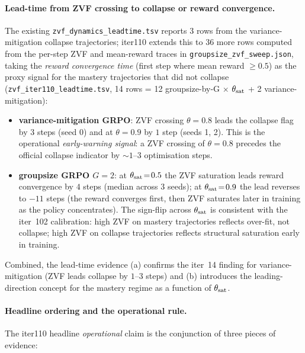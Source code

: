 \paragraph{Lead-time from ZVF crossing to collapse or reward
convergence.}
The existing \texttt{zvf\_dynamics\_leadtime.tsv} reports 3 rows from
the variance-mitigation collapse trajectories; iter110 extends this
to 36 more rows computed from the per-step ZVF and mean-reward traces
in \texttt{groupsize\_zvf\_sweep.json}, taking the \emph{reward
convergence time} (first step where mean reward $\geq 0.5$) as the
proxy signal for the mastery trajectories that did not collapse
(\texttt{zvf\_iter110\_leadtime.tsv}, 14 rows = 12
groupsize-by-G $\times$ $\theta_{\rm sat}$ + 2 variance-mitigation):

\begin{itemize}
\item \textbf{variance-mitigation GRPO}: ZVF crossing $\theta\!=\!0.8$
  leads the collapse flag by $3$ steps (seed 0) and at $\theta\!=\!0.9$
  by $1$ step (seeds 1, 2). This is the operational \emph{early-warning
  signal}: a ZVF crossing of $\theta\!=\!0.8$ precedes the official
  collapse indicator by $\sim\!1$--$3$ optimisation steps.
\item \textbf{groupsize GRPO $G\!=\!2$}: at $\theta_{\rm sat}\!=\!0.5$ the
ZVF saturation leads reward convergence by $4$ steps (median across
  3 seeds); at $\theta_{\rm sat}\!=\!0.9$ the lead reverses to
  $-11$ steps (the reward converges first, then ZVF saturates later
  in training as the policy concentrates). The sign-flip across
  $\theta_{\rm sat}$ is consistent with the iter~102 calibration:
  high ZVF on mastery trajectories reflects over-fit, not collapse;
  high ZVF on collapse trajectories reflects structural saturation
  early in training.
\end{itemize}

\noindent Combined, the lead-time evidence (a) confirms the iter~14
finding for variance-mitigation (ZVF leads collapse by $1$--$3$
steps) and (b) introduces the leading-direction concept for the
mastery regime as a function of $\theta_{\rm sat}$.

\paragraph{Headline ordering and the operational rule.}
The iter110 headline \emph{operational} claim is the conjunction of
three pieces of evidence:

